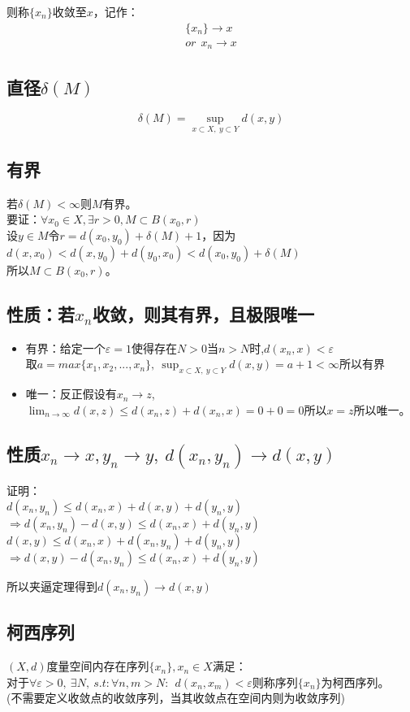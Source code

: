 \documentclass[11pt]{article}
\begin{document}
\begin{CJK*}{UTF8}{gbsn}
则称$\{x_n\}$收敛至$x$，记作：
\begin{align*}
	\{x_n\}\rightarrow x\\
	or~~x_n\rightarrow x
\end{align*}
\subsection{直径$\delta(M)$}
	\begin{equation}
		\delta(M)=\sup_{x\subset X,~y\subset Y}d(x,y)
	\end{equation}

\subsection{有界}	
若$\delta(M)<\infty$则$M$有界。\\
要证：$\forall x_0\in X,\exists r>0,M\subset B(x_0,r)$\\
设$y\in M$令$r=d(x_0,y_0)+\delta(M)+1$，因为$d(x,x_0)<d(x,y_0)+d(y_0,x_0)<d(x_0,y_0)+\delta(M)$\\所以$M\subset B(x_0,r)$。
\subsection{性质：若${x_n}$收敛，则其有界，且极限唯一}
\begin{itemize}
	\item 有界：给定一个$\varepsilon=1$使得存在$N>0$当$n>N时$,$d(x_n,x)<\varepsilon$\\
取$a=max\{x_1,x_2,...,x_n\},~\sup_{x\subset X,~y\subset Y}d(x,y)=a+1<\infty$所以有界
\item 唯一：反正假设有$x_n\rightarrow z$,~$\mathop{lim}_{n\rightarrow\infty}d(x,z)\leq d(x_n,z)+d(x_n,x)=0+0=0$所以$x=z$所以唯一。
\end{itemize}
\subsection{性质$x_n\rightarrow x,y_n\rightarrow y,~d(x_n,y_n)\rightarrow d(x,y)$}
证明：\\
$d(x_n,y_n)\leq d(x_n,x)+d(x,y)+d(y_n,y)$\\
$\Rightarrow d(x_n,y_n)-d(x,y)\leq d(x_n,x)+d(y_n,y)$\\
$d(x,y)\leq d(x_n,x)+d(x_n,y_n)+d(y_n,y)$\\
$\Rightarrow d(x,y)-d(x_n,y_n)\leq d(x_n,x)+d(y_n,y)$

所以夹逼定理得到$d(x_n,y_n)\rightarrow d(x,y)$
\subsection{柯西序列}
$(X,d)$度量空间内存在序列$\{x_n\},x_n \in X$满足：\\
对于$\forall \varepsilon >0,~\exists N,~s.t:\forall n,m>N:~~ d(x_n,x_m)<\varepsilon$则称序列$\{x_n\}$为柯西序列。\\(不需要定义收敛点的收敛序列，当其收敛点在空间内则为收敛序列)

\end{CJK*}
\end{document}
